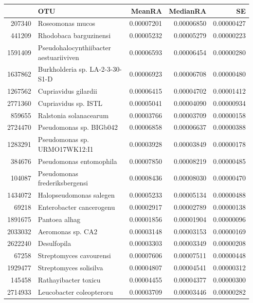 \begin{table}[ht]
\centering
\begin{tabular}{rlrrr}
  \hline
 & OTU & MeanRA & MedianRA & SE \\ 
  \hline
207340 & Roseomonas mucos & 0.00007201 & 0.00006850 & 0.00000427 \\ 
  441209 & Rhodobaca barguzinensi & 0.00005232 & 0.00005279 & 0.00000223 \\ 
  1591409 & Pseudohalocynthiibacter aestuariiviven & 0.00006593 & 0.00006454 & 0.00000280 \\ 
  1637862 & Burkholderia sp. LA-2-3-30-S1-D & 0.00006923 & 0.00006708 & 0.00000480 \\ 
  1267562 & Cupriavidus gilardii & 0.00006415 & 0.00004702 & 0.00001412 \\ 
  2771360 & Cupriavidus sp. ISTL & 0.00005041 & 0.00004090 & 0.00000934 \\ 
  859655 & Ralstonia solanacearum & 0.00003766 & 0.00003709 & 0.00000158 \\ 
  2724470 & Pseudomonas sp. BIGb042 & 0.00006858 & 0.00006637 & 0.00000388 \\ 
  1283291 & Pseudomonas sp. URMO17WK12:I1 & 0.00003928 & 0.00003849 & 0.00000178 \\ 
  384676 & Pseudomonas entomophila & 0.00007850 & 0.00008219 & 0.00000485 \\ 
  104087 & Pseudomonas frederiksbergensi & 0.00008436 & 0.00008030 & 0.00000470 \\ 
  1434072 & Halopseudomonas salegen & 0.00005233 & 0.00005134 & 0.00000488 \\ 
  69218 & Enterobacter cancerogenu & 0.00002917 & 0.00002789 & 0.00000138 \\ 
  1891675 & Pantoea alhag & 0.00001856 & 0.00001904 & 0.00000096 \\ 
  2033032 & Aeromonas sp. CA2 & 0.00003148 & 0.00003153 & 0.00000169 \\ 
  2622240 & Desulfopila & 0.00003303 & 0.00003349 & 0.00000208 \\ 
  67258 & Streptomyces cavourensi & 0.00007606 & 0.00007511 & 0.00000448 \\ 
  1929477 & Streptomyces solisilva & 0.00004807 & 0.00004541 & 0.00000312 \\ 
  145458 & Rathayibacter toxicu & 0.00004455 & 0.00004377 & 0.00000300 \\ 
  2714933 & Leucobacter coleopteroru & 0.00003709 & 0.00003446 & 0.00000282 \\ 

\end{tabular}
\end{table}
